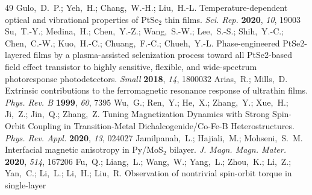 \documentclass[journal=jacsat,manuscript=article]{achemso}
\begin{document}
\begin{mcitethebibliography}{49}
\EndOfBibitem
{}
Gulo,~D.~P.; Yeh,~H.; Chang,~W.-H.; Liu,~H.-L. Temperature-dependent optical
  and vibrational properties of PtSe$_2$ thin films. \emph{Sci. Rep.}
  \textbf{2020}, \emph{10}, 19003\relax
\mciteBstWouldAddEndPuncttrue
\mciteSetBstMidEndSepPunct{\mcitedefaultmidpunct}
{\mcitedefaultendpunct}{\mcitedefaultseppunct}\relax
\EndOfBibitem
{}
Su,~T.-Y.; Medina,~H.; Chen,~Y.-Z.; Wang,~S.-W.; Lee,~S.-S.; Shih,~Y.-C.;
  Chen,~C.-W.; Kuo,~H.-C.; Chuang,~F.-C.; Chueh,~Y.-L. Phase-engineered
  PtSe2-layered films by a plasma-assisted selenization process toward all
  PtSe2-based field effect transistor to highly sensitive, flexible, and
  wide-spectrum photoresponse photodetectors. \emph{Small} \textbf{2018},
  \emph{14}, 1800032\relax
\mciteBstWouldAddEndPuncttrue
\mciteSetBstMidEndSepPunct{\mcitedefaultmidpunct}
{\mcitedefaultendpunct}{\mcitedefaultseppunct}\relax
\EndOfBibitem
{}
Arias,~R.; Mills,~D. Extrinsic contributions to the ferromagnetic resonance
  response of ultrathin films. \emph{Phys. Rev. B} \textbf{1999}, \emph{60},
  7395\relax
\mciteBstWouldAddEndPuncttrue
\mciteSetBstMidEndSepPunct{\mcitedefaultmidpunct}
{\mcitedefaultendpunct}{\mcitedefaultseppunct}\relax
\EndOfBibitem
{}
Wu,~G.; Ren,~Y.; He,~X.; Zhang,~Y.; Xue,~H.; Ji,~Z.; Jin,~Q.; Zhang,~Z. Tuning
  Magnetization Dynamics with Strong Spin-Orbit Coupling in Transition-Metal
  Dichalcogenide/Co-Fe-B Heterostructures. \emph{Phys. Rev. Appl.}
  \textbf{2020}, \emph{13}, 024027\relax
\mciteBstWouldAddEndPuncttrue
\mciteSetBstMidEndSepPunct{\mcitedefaultmidpunct}
{\mcitedefaultendpunct}{\mcitedefaultseppunct}\relax
\EndOfBibitem
{}
Jamilpanah,~L.; Hajiali,~M.; Mohseni,~S.~M. Interfacial magnetic anisotropy in
  Py/MoS$_2$ bilayer. \emph{J. Magn. Magn. Mater.} \textbf{2020}, \emph{514},
  167206\relax
\mciteBstWouldAddEndPuncttrue
\mciteSetBstMidEndSepPunct{\mcitedefaultmidpunct}
{\mcitedefaultendpunct}{\mcitedefaultseppunct}\relax
\EndOfBibitem
{}
Fu,~Q.; Liang,~L.; Wang,~W.; Yang,~L.; Zhou,~K.; Li,~Z.; Yan,~C.; Li,~L.;
  Li,~H.; Liu,~R. Observation of nontrivial spin-orbit torque in single-layer

\end{mcitethebibliography}
\end{document}
